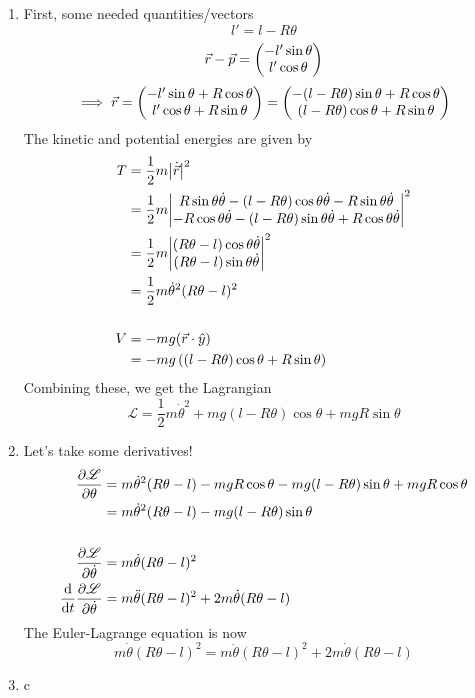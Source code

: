 \documentclass[12pt]{article}
\newcommand{\magsq}[1]{\big|#1\big|^2}
\begin{document}
\begin{enumerate}[label=(\alph*)]
    \item First, some needed quantities/vectors
    \[ l' = l - R\theta \]
    \[ \vec{r} - \vec{p} = \mqty(-l'\sin\theta \\ l'\cos\theta) \]
    \[ \implies \vec{r} = \mqty(-l'\sin\theta + R\cos\theta \\ l'\cos\theta + R\sin\theta) = \mqty(-(l-R\theta)\sin\theta + R\cos\theta \\ (l-R\theta)\cos\theta + R\sin\theta) \]
    The kinetic and potential energies are given by
    \begin{align*}
        T &= \frac{1}{2}m\magsq{\dot{\vec{r}}} \\
        &= \frac{1}{2}m\mqty|R\sin\theta\dot{\theta} - (l-R\theta)\cos\theta\dot{\theta} - R\sin\theta\dot{\theta} \\ -R\cos\theta\dot{\theta} - (l-R\theta)\sin\theta\dot{\theta} + R\cos\theta\dot{\theta}|^2 \\
        &= \frac{1}{2}m\mqty|(R\theta-l)\cos\theta\dot{\theta} \\ (R\theta - l)\sin\theta\dot{\theta}|^2 \\
        &= \frac{1}{2}m\dot{\theta}^2(R\theta - l)^2 \\
        \\
        V &= -mg(\vec{r}\cdot\hat{y}) \\
        &= -mg\left((l-R\theta)\cos\theta + R\sin\theta\right)
    \end{align*}
    Combining these, we get the Lagrangian
    \[ \boxed{\mathscr{L} = \frac{1}{2}m\dot{\theta}^2 + mg(l-R\theta)\cos\theta + mgR\sin\theta} \]
    
    \item Let's take some derivatives!
    \begin{align*}
        \pdv{\mathscr{L}}{\theta} &= m\dot{\theta}^2(R\theta - l) - mgR\cos\theta - mg(l-R\theta)\sin\theta + mgR\cos\theta \\
        &= m\dot{\theta}^2(R\theta - l) - mg(l-R\theta)\sin\theta \\
        \\
        \pdv{\mathscr{L}}{\dot{\theta}} &= m\dot{\theta}(R\theta - l)^2 \\
        \dv{t}\pdv{\mathscr{L}}{\dot{\theta}} &= m\ddot{\theta}(R\theta - l)^2 + 2m\dot{\theta}(R\theta - l)
    \end{align*}
    The Euler-Lagrange equation is now
    \[ m\dot{\theta}(R\theta -l)^2 = m\ddot{\theta}(R\theta - l)^2 + 2m\dot{\theta}(R\theta - l) \]

    \item c
\end{enumerate}
\end{document}
